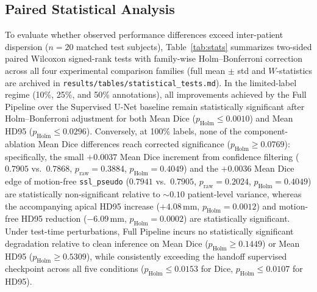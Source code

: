 \documentclass[pdflatex,sn-mathphys]{sn-jnl}
\theoremstyle{thmstyleone}
\theoremstyle{thmstyletwo}
\theoremstyle{thmstylethree}
\begin{document}
\subsection{Paired Statistical Analysis}
To evaluate whether observed performance differences exceed inter-patient dispersion ($n = 20$ matched test subjects), Table~\ref{tab:stats} summarizes two-sided paired Wilcoxon signed-rank tests with family-wise Holm--Bonferroni correction across all four experimental comparison families (full mean $\pm$ std and $W$-statistics are archived in \texttt{results/tables/statistical\_tests.md}). In the limited-label regime (10\%, 25\%, and 50\% annotations), all improvements achieved by the Full Pipeline over the Supervised U-Net baseline remain statistically significant after Holm--Bonferroni adjustment for both Mean Dice ($p_{\text{Holm}} \le 0.0010$) and Mean HD95 ($p_{\text{Holm}} \le 0.0296$). Conversely, at 100\% labels, none of the component-ablation Mean Dice differences reach corrected significance ($p_{\text{Holm}} \ge 0.0769$): specifically, the small $+0.0037$ Mean Dice increment from confidence filtering ($0.7905$ vs.\ $0.7868$, $p_{\text{raw}} = 0.3884$, $p_{\text{Holm}} = 0.4049$) and the $+0.0036$ Mean Dice edge of motion-free \texttt{ssl\_pseudo} ($0.7941$ vs.\ $0.7905$, $p_{\text{raw}} = 0.2024$, $p_{\text{Holm}} = 0.4049$) are statistically non-significant relative to $\sim 0.10$ patient-level variance, whereas the accompanying apical HD95 increase ($+4.08$\,mm, $p_{\text{Holm}} = 0.0012$) and motion-free HD95 reduction ($-6.09$\,mm, $p_{\text{Holm}} = 0.0002$) are statistically significant. Under test-time perturbations, Full Pipeline incurs no statistically significant degradation relative to clean inference on Mean Dice ($p_{\text{Holm}} \ge 0.1449$) or Mean HD95 ($p_{\text{Holm}} \ge 0.5309$), while consistently exceeding the handoff supervised checkpoint across all five conditions ($p_{\text{Holm}} \le 0.0153$ for Dice, $p_{\text{Holm}} \le 0.0107$ for HD95).
\end{document}
